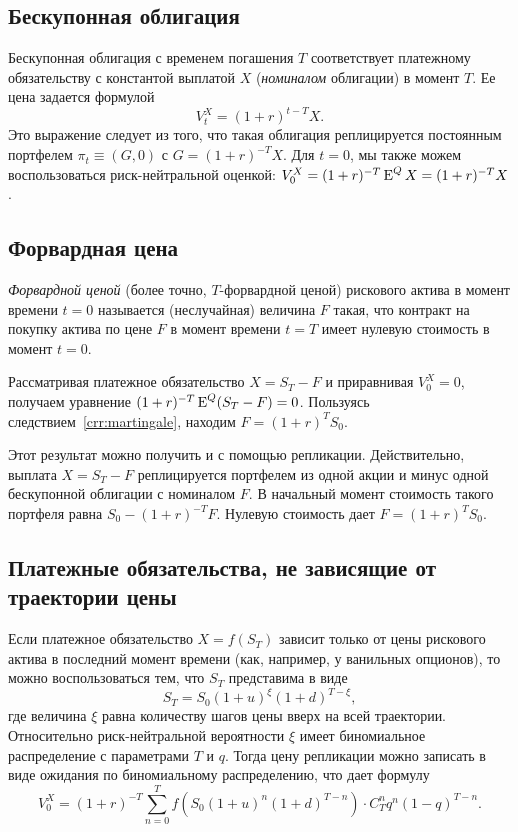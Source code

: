 \subsection{Бескупонная облигация}
Бескупонная облигация с временем погашения $T$ соответствует платежному обязательству с константой выплатой $X$ (\emph{номиналом} облигации) в момент $T$.
Ее цена задается формулой
\[
V_t^X = (1+r)^{t-T}X.
\]
Это выражение следует из того, что такая облигация реплицируется постоянным портфелем $\pi_t\equiv(G,0)$ с $G = (1+r)^{-T} X$.
Для $t=0$, мы также можем воспользоваться риск-нейтральной оценкой: $V_0^X = (1+r)^{-T} \operatorname{E}^Q X = (1+r)^{-T} X$.

\subsection{Форвардная цена}
\emph{Форвардной ценой} (более точно, $T$-форвардной ценой) рискового актива в момент времени $t=0$ называется (неслучайная) величина $F$ такая, что контракт на покупку актива по цене $F$ в момент времени $t=T$ имеет нулевую стоимость в момент $t=0$. 

Рассматривая платежное обязательство $X=S_T-F$ и приравнивая $V^X_0 = 0$, получаем уравнение
$(1+r)^{-T} \operatorname{E}^Q (S_T - F) = 0$.
Пользуясь следствием~\ref{crr:martingale}, находим $F= (1+r)^T S_0$.

Этот результат можно получить и с помощью репликации.
Действительно, выплата $X=S_T-F$ реплицируется портфелем из одной акции и минус одной бескупонной облигации с номиналом $F$.
В начальный момент стоимость такого портфеля равна $S_0 - (1+r)^{-T} F$.
Нулевую стоимость дает $F = (1+r)^T S_0$.

\subsection{Платежные обязательства, не зависящие от траектории цены}
Если платежное обязательство $X = f(S_T)$ зависит только от цены рискового актива в последний момент времени (как, например, у ванильных опционов), то можно воспользоваться тем, что $S_T$ представима в виде
\[
S_T = S_0 (1+u)^\xi(1+d)^{T-\xi},
\]
где величина $\xi$ равна количеству шагов цены вверх на всей траектории.
Относительно риск-нейтральной вероятности $\xi$ имеет биномиальное распределение с параметрами $T$ и $q$.
Тогда цену репликации можно записать в виде ожидания по биномиальному распределению, что дает формулу
\[
V_0^X = (1+r)^{-T} \sum_{n=0}^T f\left(S_0 (1+u)^n(1+d)^{T-n}\right) \cdot C_T^n q^n (1-q)^{T-n}.
\]

